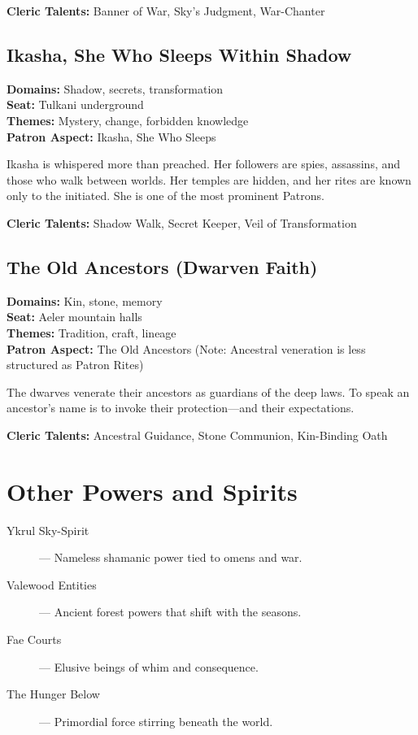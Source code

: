 \textbf{Cleric Talents:} Banner of War, Sky's Judgment, War-Chanter

\subsection*{Ikasha, She Who Sleeps Within Shadow}

\textbf{Domains:} Shadow, secrets, transformation \\
\textbf{Seat:} Tulkani underground \\
\textbf{Themes:} Mystery, change, forbidden knowledge \\
\textbf{Patron Aspect:} Ikasha, She Who Sleeps

Ikasha is whispered more than preached. Her followers are spies, assassins, and those who walk between worlds. Her temples are hidden, and her rites are known only to the initiated. She is one of the most prominent Patrons.

\textbf{Cleric Talents:} Shadow Walk, Secret Keeper, Veil of Transformation

\subsection*{The Old Ancestors (Dwarven Faith)}

\textbf{Domains:} Kin, stone, memory \\
\textbf{Seat:} Aeler mountain halls \\
\textbf{Themes:} Tradition, craft, lineage \\
\textbf{Patron Aspect:} The Old Ancestors (Note: Ancestral veneration is less structured as Patron Rites)

The dwarves venerate their ancestors as guardians of the deep laws. To speak an ancestor's name is to invoke their protection—and their expectations.

\textbf{Cleric Talents:} Ancestral Guidance, Stone Communion, Kin-Binding Oath

\section{Other Powers and Spirits}

\begin{description}
  \item[Ykrul Sky-Spirit]  — Nameless shamanic power tied to omens and war.
  \item[Valewood Entities]  — Ancient forest powers that shift with the seasons.
  \item[Fae Courts]  — Elusive beings of whim and consequence.
  \item[The Hunger Below]  — Primordial force stirring beneath the world.
\end{description}

